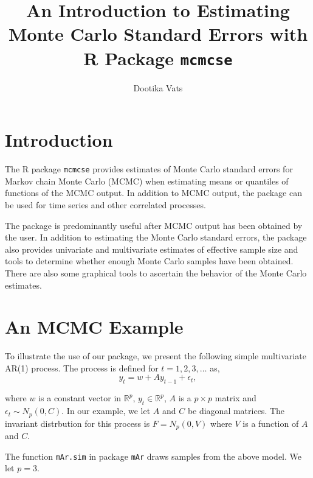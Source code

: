 \documentclass[11pt]{article}\usepackage[]{graphicx}\usepackage[]{color}
\title{An Introduction to Estimating Monte Carlo Standard Errors with R Package \texttt{mcmcse} }
\author{Dootika Vats}
\begin{document}
\maketitle
\setlength\parindent{0pt}
\tableofcontents

\break
\section{Introduction}
The R package \texttt{mcmcse} provides estimates of Monte Carlo standard errors for Markov chain Monte Carlo (MCMC) when estimating means or quantiles of functions of the MCMC output. In addition to MCMC output, the package can be used for time series and other correlated processes. 

The package is predominantly useful after MCMC output has been obtained by the user. In addition to estimating the Monte Carlo standard errors, the package also provides univariate and multivariate estimates of effective sample size and tools to determine whether enough Monte Carlo samples have been obtained. There are also some graphical tools to ascertain the behavior of the Monte Carlo estimates.



\bigskip
\section{An MCMC Example}

To illustrate the use of our package, we present the following simple multivariate AR(1) process. The process is defined for $t = 1, 2, 3, \dots$ as,
\[y_t = w + A y_{t-1} + \epsilon_t, \]

where $w$ is a constant vector in $\mathbb{R}^p$, $y_t \in \mathbb{R}^p$, $A$ is a $p \times p$ matrix and $\epsilon_t \sim N_p(0, C)$. In our example, we let $A$ and $C$ be diagonal matrices. The invariant distrbution for this process is $F = N_p(0, V)$ where $V$ is a function of $A$ and $C$. 

The function \texttt{mAr.sim} in package \texttt{mAr} draws samples from the above model. We let $p = 3$.
\end{document}
